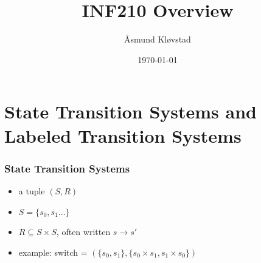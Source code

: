 \documentclass{beamer}
\title[INF210]{INF210 Overview} %
\author{Åsmund Kløvstad} %
\institute[UiB] %
{
Universitetet i Bergen \\ %
}
\date{\today} %
\begin{document}
\begin{frame}
\titlepage %
\end{frame}



\section{State Transition Systems and Labeled Transition Systems} %

\begin{frame}
\frametitle{State Transition Systems}
\begin{itemize}
\item a tuple $(S, R)$
  \item $S = \{s_0,s_1...\}$
\item $R \subseteq S \times S$, often written $s \rightarrow s'$
  \item example: switch = $(\{s_0, s_1\}, \{ s_0 \times s_1, s_1 \times s_0\})$
\end{itemize}

\begin{figure}
  \centering
{}
  \end{figure}
\end{frame}
\end{document}
